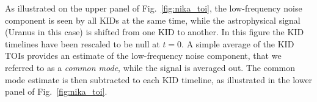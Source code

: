%

As illustrated on the upper panel of Fig.~\ref{fig:nika_toi}, the
low-frequency noise component is seen by all KIDs at the same time,
while the astrophysical signal {\lp (Uranus in this case)} is shifted
from one KID to another.
{\lp In this figure the KID timelines have been rescaled to be null
at $t=0$.} 
A simple average of the KID TOIs provides an
estimate of the low-frequency noise component, that we referred to as
a \emph{common mode}, while the signal is averaged out. The common mode
estimate is then subtracted to each KID timeline, as illustrated in
the lower panel of Fig.~\ref{fig:nika_toi}.


